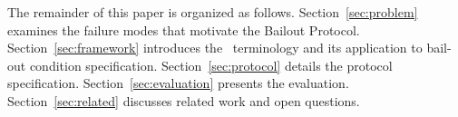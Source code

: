 The remainder of this paper is organized as follows. Section~\ref{sec:problem} examines the failure modes that motivate the Bailout Protocol. Section~\ref{sec:framework} introduces the \bxthree\ terminology and its application to bail-out condition specification. Section~\ref{sec:protocol} details the protocol specification. Section~\ref{sec:evaluation} presents the evaluation. Section~\ref{sec:related} discusses related work and open questions.

\label{sec:introduction}
